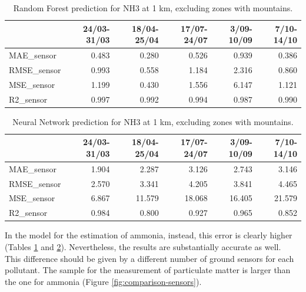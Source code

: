 \begin{table}[H]
\begin{tabular}{lrrrrr}
\toprule
  &  24/03-31/03 &  18/04-25/04 &  17/07-24/07 &  3/09-10/09 &  7/10-14/10 \\
\midrule
 MAE\_sensor &        0.483 &        0.280 &        0.526 &       0.939 &       0.386 \\
RMSE\_sensor &        0.993 &        0.558 &        1.184 &       2.316 &       0.860 \\
 MSE\_sensor &        1.199 &        0.430 &        1.556 &       6.147 &       1.121 \\
  R2\_sensor &        0.997 &        0.992 &        0.994 &       0.987 &       0.990 \\
\bottomrule
\end{tabular}
\caption{Random Forest prediction for NH3 at 1 km, excluding zones with mountains.}
\label{tab:nh3RF}
\end{table}
\begin{table}[H]
\begin{tabular}{lrrrrr}
\toprule
  &  24/03-31/03 &  18/04-25/04 &  17/07-24/07 &  3/09-10/09 &  7/10-14/10 \\
\midrule
 MAE\_sensor &        1.904 &        2.287 &        3.126 &       2.743 &       3.146 \\
RMSE\_sensor &        2.570 &        3.341 &        4.205 &       3.841 &       4.465 \\
 MSE\_sensor &        6.867 &       11.579 &       18.068 &      16.405 &      21.579 \\
  R2\_sensor &        0.984 &        0.800 &        0.927 &       0.965 &       0.852 \\
\bottomrule
\end{tabular}
\caption{Neural Network prediction for NH3 at 1 km, excluding zones with mountains.}
\label{tab:nh3NN}
\end{table}
In the model for the estimation of ammonia, instead, this error is clearly higher (Tables \ref{tab:nh3RF} and \ref{tab:nh3NN}).
Nevertheless, the results are substantially accurate as well. \\
This difference should be given by a different number of ground sensors for each pollutant. The sample for the measurement of particulate matter is larger than the one for ammonia (Figure \ref{fig:comparison-sensors}).
